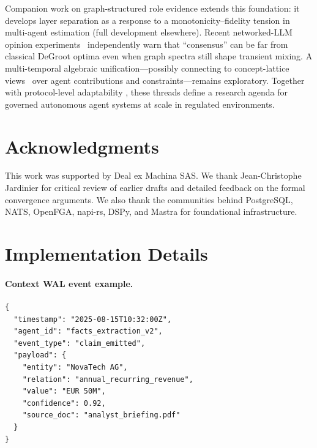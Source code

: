 \documentclass[11pt]{article}
\begin{document}
Companion work on graph-structured role evidence extends this foundation: it develops layer separation as a response to a monotonicity--fidelity tension in multi-agent estimation (full development elsewhere). Recent networked-LLM opinion experiments~\cite{yazici2026opinion} independently warn that ``consensus'' can be far from classical DeGroot optima even when graph spectra still shape transient mixing. A multi-temporal algebraic unification---possibly connecting to concept-lattice views~\cite{ganter1999} over agent contributions and constraints---remains exploratory. Together with protocol-level adaptability \cite{delachica2026}, these threads define a research agenda for governed autonomous agent systems at scale in regulated environments.

\section*{Acknowledgments}
This work was supported by Deal ex Machina SAS. We thank Jean-Christophe Jardinier for critical review of earlier drafts and detailed feedback on the formal convergence arguments. We also thank the communities behind PostgreSQL, NATS, OpenFGA, napi-rs, DSPy, and Mastra for foundational infrastructure.




\appendix

\section{Implementation Details}
\label{sec:app-implementation}

\paragraph{Context WAL event example.}
\begin{lstlisting}
{
  "timestamp": "2025-08-15T10:32:00Z",
  "agent_id": "facts_extraction_v2",
  "event_type": "claim_emitted",
  "payload": {
    "entity": "NovaTech AG",
    "relation": "annual_recurring_revenue",
    "value": "EUR 50M",
    "confidence": 0.92,
    "source_doc": "analyst_briefing.pdf"
  }
}
\end{lstlisting}
\end{document}

